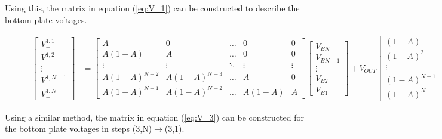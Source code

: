 \documentclass[conference]{IEEEtran}
\begin{document}
	Using this, the matrix in equation (\ref{eq:V_1}) can be constructed to describe the bottom plate voltages.
\begin{figure}
		\begin{equation}
	\begin{split}
	\begin{bmatrix}
	V_-^{1,1} \\
	V_-^{1,2} \\
	\vdots\\
	V_-^{1,N-1} \\ 
	V_-^{1,N}
	\end{bmatrix}
	&\!=\!
	\begin{bmatrix}
	A \!& 0 & \dots & 0 & 0 \\
	A(1-A) \!& A & \dots & 0 & 0\\
	\vdots & \vdots & \ddots & \vdots & \vdots \\
	A(1\!-\!A)^{N-2} \!& A(1\!-\!A)^{N-3} \!& \dots & A & 0\\ 
	A(1\!-\!A)^{N-1} \!& A(1\!-\!A)^{N-2} \!& \dots & A(1-A) & A 
	\end{bmatrix}\!\begin{bmatrix}
	V_{BN} \\
	V_{BN-1} \\
	\vdots \\
	V_{B2} \\
	V_{B1}
	\end{bmatrix}+V_{OUT}\begin{bmatrix}
	(1-A) \\
	(1-A)^2 \\
	\vdots \\
	(1-A)^{N-1} \\
	(1-A)^N
	\end{bmatrix}
	\end{split}
	\label{eq:V_1}
	\end{equation}
\end{figure}
	Using a similar method, the matrix in equation (\ref{eq:V_3}) can be constructed for the bottom plate voltages in steps (3,N)$\rightarrow$(3,1).
\end{document}

